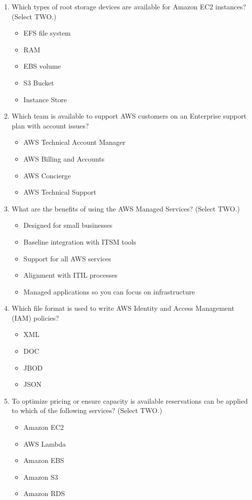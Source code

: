\begin{enumerate}
	\item Which types of root storage devices are available for Amazon EC2 instances? (Select TWO.)
	\begin{itemize}
		\item EFS file system
		\item RAM
		\item EBS volume
		\item S3 Bucket
		\item Instance Store
	\end{itemize}

	\item Which team is available to support AWS customers on an Enterprise support plan with account issues?
	\begin{itemize}
		\item AWS Technical Account Manager
		\item AWS Billing and Accounts
		\item AWS Concierge
		\item AWS Technical Support
	\end{itemize}

	\item What are the benefits of using the AWS Managed Services? (Select TWO.)
	\begin{itemize}
		\item Designed for small businesses
		\item Baseline integration with ITSM tools
		\item Support for all AWS services
		\item Alignment with ITIL processes
		\item Managed applications so you can focus on infrastructure
	\end{itemize}

	\item Which file format is used to write AWS Identity and Access Management (IAM) policies?
	\begin{itemize}
		\item XML
		\item DOC
		\item JBOD
		\item JSON
	\end{itemize}

	\item To optimize pricing or ensure capacity is available reservations can be applied to which of the following services? (Select TWO.)
	\begin{itemize}
		\item Amazon EC2
		\item AWS Lambda
		\item Amazon EBS
		\item Amazon S3
		\item Amazon RDS
	\end{itemize}


\end{enumerate}
